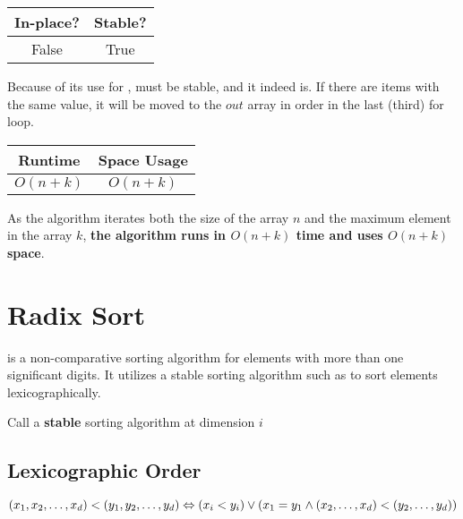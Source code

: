 \documentclass{report}
\begin{document}
\begin{center}
  \begin{tabular}{ | c | c | }
    \hline
    In-place? & Stable? \\
    \hline
    False & True \\
    \hline
  \end{tabular}
\end{center}

Because of its use for ,  must be stable, and it indeed is. If there are items with the same value, it will be moved to the $out$ array in order in the last (third) for loop.

\begin{center}
  \begin{tabular}{ | c | c | }
    \hline
    Runtime & Space Usage \\
    \hline
    $O(n + k)$ & $O(n + k)$ \\
    \hline
  \end{tabular}
\end{center}

As the algorithm iterates both the size of the array $n$ and the maximum element in the array $k$, \textbf{the algorithm runs in $O(n + k)$ time and uses $O(n + k)$ space}.

\section{Radix Sort}

 is a non-comparative sorting algorithm for elements with more than one significant digits. It utilizes a stable sorting algorithm such as  to sort elements lexicographically.

\noindent \hrulefill
\begin{algorithmic}[1]
   
      \State Call a \textbf{stable} sorting algorithm at dimension $i$
    \EndFor
    \State {}
  \EndFunction
\end{algorithmic}
\noindent \hrulefill

\subsection{Lexicographic Order}

\[
  (x_1, x_2, \ldots, x_d) < (y_1, y_2, \ldots, y_d) \\
  \Leftrightarrow \\
  (x_i < y_i) \lor (x_1 = y_1 \land (x_2, \ldots, x_d) < (y_2, \ldots, y_d))
\]
\end{document}
